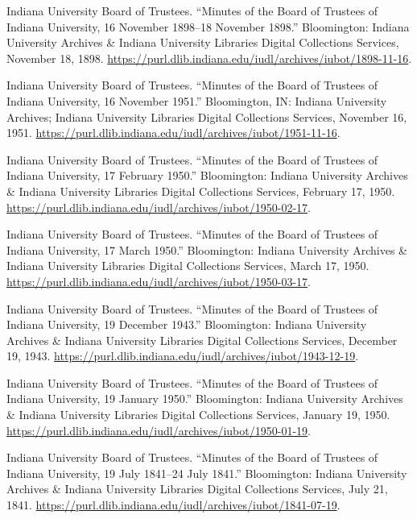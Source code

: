 \documentclass[
  american,
  letterpaper,
]{scrreprt}
\newlength{\cslhangindent}
\newenvironment{CSLReferences}[2] %
 {\begin{list}{}{%
  \setlength{\itemindent}{0pt}
  \setlength{\leftmargin}{0pt}
  \setlength{\parsep}{0pt}
  \ifodd #1
   \setlength{\leftmargin}{\cslhangindent}
   \setlength{\itemindent}{-1\cslhangindent}
  \fi
  \setlength{\itemsep}{#2\baselineskip}}}
 {\end{list}}
\begin{document}
\begin{CSLReferences}{1}{0}
Indiana University Board of Trustees. {``Minutes of the Board of
Trustees of Indiana University, 16 November 1898--18 November 1898.''}
Bloomington: Indiana University Archives \& Indiana University Libraries
Digital Collections Services, November 18, 1898.
\url{https://purl.dlib.indiana.edu/iudl/archives/iubot/1898-11-16}.

Indiana University Board of Trustees. {``Minutes of the Board of
Trustees of Indiana University, 16 November 1951.''} Bloomington, IN:
Indiana University Archives; Indiana University Libraries Digital
Collections Services, November 16, 1951.
\url{https://purl.dlib.indiana.edu/iudl/archives/iubot/1951-11-16}.

Indiana University Board of Trustees. {``Minutes of the Board of
Trustees of Indiana University, 17 February 1950.''} Bloomington:
Indiana University Archives \& Indiana University Libraries Digital
Collections Services, February 17, 1950.
\url{https://purl.dlib.indiana.edu/iudl/archives/iubot/1950-02-17}.

Indiana University Board of Trustees. {``Minutes of the Board of
Trustees of Indiana University, 17 March 1950.''} Bloomington: Indiana
University Archives \& Indiana University Libraries Digital Collections
Services, March 17, 1950.
\url{https://purl.dlib.indiana.edu/iudl/archives/iubot/1950-03-17}.

Indiana University Board of Trustees. {``Minutes of the Board of
Trustees of Indiana University, 19 December 1943.''} Bloomington:
Indiana University Archives \& Indiana University Libraries Digital
Collections Services, December 19, 1943.
\url{https://purl.dlib.indiana.edu/iudl/archives/iubot/1943-12-19}.

Indiana University Board of Trustees. {``Minutes of the Board of
Trustees of Indiana University, 19 January 1950.''} Bloomington: Indiana
University Archives \& Indiana University Libraries Digital Collections
Services, January 19, 1950.
\url{https://purl.dlib.indiana.edu/iudl/archives/iubot/1950-01-19}.

Indiana University Board of Trustees. {``Minutes of the Board of
Trustees of Indiana University, 19 July 1841--24 July 1841.''}
Bloomington: Indiana University Archives \& Indiana University Libraries
Digital Collections Services, July 21, 1841.
\url{https://purl.dlib.indiana.edu/iudl/archives/iubot/1841-07-19}.


\end{CSLReferences}
\end{document}
